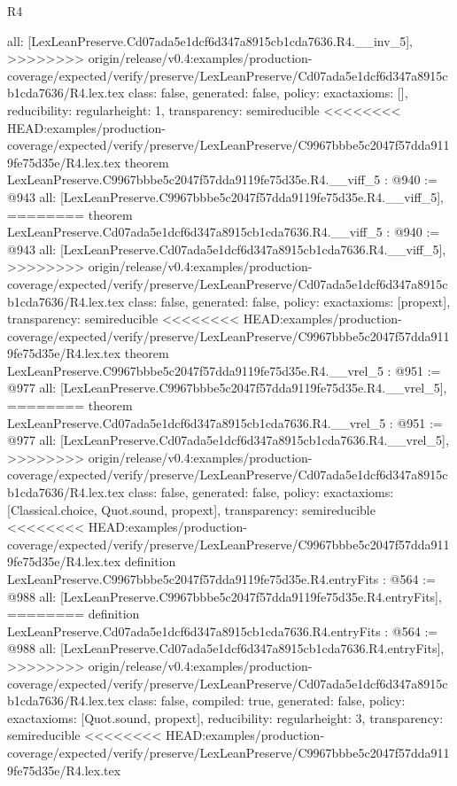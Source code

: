 \begin{lexlean}{R4}
\begin{coremodule}
{{{{{{{{{{{{  all: [LexLeanPreserve.Cd07ada5e1dcf6d347a8915cb1cda7636.R4.__inv_5],
>>>>>>>> origin/release/v0.4:examples/production-coverage/expected/verify/preserve/LexLeanPreserve/Cd07ada5e1dcf6d347a8915cb1cda7636/R4.lex.tex
  class: false,
  generated: false,
  policy: exact{axioms: []},
  reducibility: regular{height: 1},
  transparency: semireducible
}
<<<<<<<< HEAD:examples/production-coverage/expected/verify/preserve/LexLeanPreserve/C9967bbbe5c2047f57dda9119fe75d35e/R4.lex.tex
theorem LexLeanPreserve.C9967bbbe5c2047f57dda9119fe75d35e.R4.__viff_5 : @940 := @943 {
  all: [LexLeanPreserve.C9967bbbe5c2047f57dda9119fe75d35e.R4.__viff_5],
========
theorem LexLeanPreserve.Cd07ada5e1dcf6d347a8915cb1cda7636.R4.__viff_5 : @940 := @943 {
  all: [LexLeanPreserve.Cd07ada5e1dcf6d347a8915cb1cda7636.R4.__viff_5],
>>>>>>>> origin/release/v0.4:examples/production-coverage/expected/verify/preserve/LexLeanPreserve/Cd07ada5e1dcf6d347a8915cb1cda7636/R4.lex.tex
  class: false,
  generated: false,
  policy: exact{axioms: [propext]},
  transparency: semireducible
}
<<<<<<<< HEAD:examples/production-coverage/expected/verify/preserve/LexLeanPreserve/C9967bbbe5c2047f57dda9119fe75d35e/R4.lex.tex
theorem LexLeanPreserve.C9967bbbe5c2047f57dda9119fe75d35e.R4.__vrel_5 : @951 := @977 {
  all: [LexLeanPreserve.C9967bbbe5c2047f57dda9119fe75d35e.R4.__vrel_5],
========
theorem LexLeanPreserve.Cd07ada5e1dcf6d347a8915cb1cda7636.R4.__vrel_5 : @951 := @977 {
  all: [LexLeanPreserve.Cd07ada5e1dcf6d347a8915cb1cda7636.R4.__vrel_5],
>>>>>>>> origin/release/v0.4:examples/production-coverage/expected/verify/preserve/LexLeanPreserve/Cd07ada5e1dcf6d347a8915cb1cda7636/R4.lex.tex
  class: false,
  generated: false,
  policy: exact{axioms: [Classical.choice, Quot.sound, propext]},
  transparency: semireducible
}
<<<<<<<< HEAD:examples/production-coverage/expected/verify/preserve/LexLeanPreserve/C9967bbbe5c2047f57dda9119fe75d35e/R4.lex.tex
definition LexLeanPreserve.C9967bbbe5c2047f57dda9119fe75d35e.R4.entryFits : @564 := @988 {
  all: [LexLeanPreserve.C9967bbbe5c2047f57dda9119fe75d35e.R4.entryFits],
========
definition LexLeanPreserve.Cd07ada5e1dcf6d347a8915cb1cda7636.R4.entryFits : @564 := @988 {
  all: [LexLeanPreserve.Cd07ada5e1dcf6d347a8915cb1cda7636.R4.entryFits],
>>>>>>>> origin/release/v0.4:examples/production-coverage/expected/verify/preserve/LexLeanPreserve/Cd07ada5e1dcf6d347a8915cb1cda7636/R4.lex.tex
  class: false,
  compiled: true,
  generated: false,
  policy: exact{axioms: [Quot.sound, propext]},
  reducibility: regular{height: 3},
  transparency: semireducible
}
<<<<<<<< HEAD:examples/production-coverage/expected/verify/preserve/LexLeanPreserve/C9967bbbe5c2047f57dda9119fe75d35e/R4.lex.tex
}}}}}}}}}}}}}}
\end{coremodule}
\end{lexlean}
